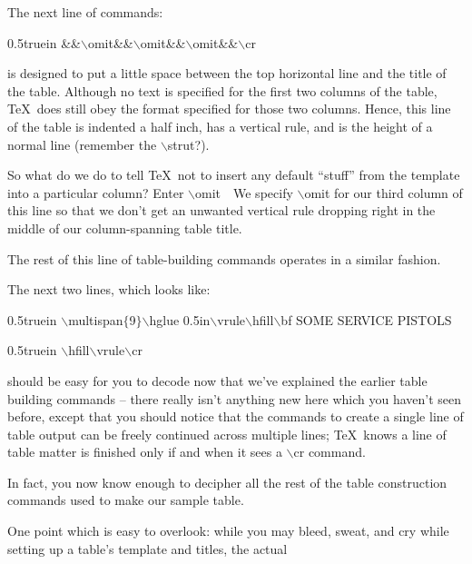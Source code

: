 The next line of commands:
\bigskip\par\noindent\hglue 0.5truein
{\twltt \&\&$\backslash$omit\&\&$\backslash$omit\&\&$\backslash$omit\&\&$\backslash$cr}
\bigskip\par\noindent
is designed to put a little space between the top horizontal line
and the title of the table. Although no text is specified for the first two 
columns of the table, \TeX\ does still obey the format specified for those two
columns. Hence, this line of the table is indented a half 
inch, has a vertical rule, and is the height of a normal 
line (remember the 
{\twltt $\backslash$strut}?). 
\par\noindent\bigskip
So what do we do to tell \TeX\ {\twlbf not} to insert any default 
``stuff'' from the template into a particular column? Enter 
{\twltt $\backslash$omit}\ \ We specify 
{\twltt $\backslash$omit} for our third column of this line so 
that we don't get an unwanted vertical rule 
dropping right in the middle of our column-spanning table 
title. 
\bigskip\par\noindent
The rest of this line of table-building commands operates in a 
similar fashion.
\bigskip\par\noindent
The next two lines, which looks like:
{\twltt \bigskip\par\noindent\hglue 0.5truein
$\backslash$multispan$\{$9$\}${}$\backslash$hglue 0.5in$\backslash$vrule$\backslash$hfill$\backslash$bf SOME SERVICE PISTOLS
\par\noindent\hglue 0.5truein
$\backslash$hfill$\backslash$vrule$\backslash$cr}
\bigskip\par\noindent
should be easy for you to decode now that we've explained the earlier 
table building commands -- there really isn't anything new here which you
haven't seen before, except that you should
notice that the commands to create a single line of table
output can be freely continued across multiple lines; \TeX\ knows a line of
table matter is finished only if and when it sees a {\twltt $\backslash$cr}
command.
\bigskip\par\noindent
In fact, you now know enough to decipher {\twlbf all} the rest of the 
table construction commands used to make our sample table.
\vfill\eject
\bigskip\par\noindent
One point which is easy to overlook: while you may bleed, sweat, and cry
while setting up a table's template and titles, the actual 
